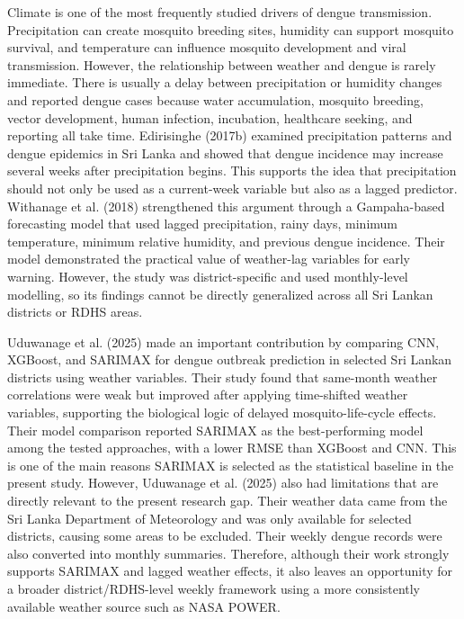 \documentclass[12pt,a4paper]{article}
\begin{document}
Climate is one of the most frequently studied drivers of dengue transmission. Precipitation can create mosquito breeding sites, humidity can support mosquito survival, and temperature can influence mosquito development and viral transmission. However, the relationship between weather and dengue is rarely immediate. There is usually a delay between precipitation or humidity changes and reported dengue cases because water accumulation, mosquito breeding, vector development, human infection, incubation, healthcare seeking, and reporting all take time. Edirisinghe (2017b) examined precipitation patterns and dengue epidemics in Sri Lanka and showed that dengue incidence may increase several weeks after precipitation begins. This supports the idea that precipitation should not only be used as a current-week variable but also as a lagged predictor. Withanage et al. (2018) strengthened this argument through a Gampaha-based forecasting model that used lagged precipitation, rainy days, minimum temperature, minimum relative humidity, and previous dengue incidence. Their model demonstrated the practical value of weather-lag variables for early warning. However, the study was district-specific and used monthly-level modelling, so its findings cannot be directly generalized across all Sri Lankan districts or RDHS areas.

Uduwanage et al. (2025) made an important contribution by comparing CNN, XGBoost, and SARIMAX for dengue outbreak prediction in selected Sri Lankan districts using weather variables. Their study found that same-month weather correlations were weak but improved after applying time-shifted weather variables, supporting the biological logic of delayed mosquito-life-cycle effects. Their model comparison reported SARIMAX as the best-performing model among the tested approaches, with a lower RMSE than XGBoost and CNN. This is one of the main reasons SARIMAX is selected as the statistical baseline in the present study. However, Uduwanage et al. (2025) also had limitations that are directly relevant to the present research gap. Their weather data came from the Sri Lanka Department of Meteorology and was only available for selected districts, causing some areas to be excluded. Their weekly dengue records were also converted into monthly summaries. Therefore, although their work strongly supports SARIMAX and lagged weather effects, it also leaves an opportunity for a broader district/RDHS-level weekly framework using a more consistently available weather source such as NASA POWER.
\end{document}

